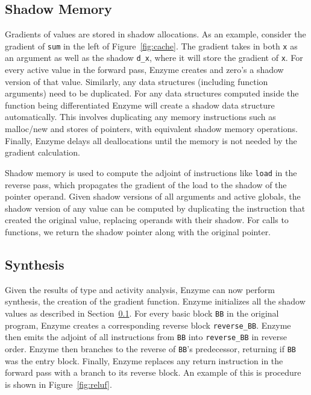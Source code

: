 \subsection{Shadow Memory}
\label{sec:shadow}
Gradients of values are stored in shadow allocations. As an example, consider the gradient of \texttt{sum} in the left of Figure~\ref{fig:cache}. The gradient takes in both \texttt{x} as an argument as well as the shadow \texttt{d\_x}, where it will store the gradient of \texttt{x}. For every active value in the forward pass, Enzyme creates and zero's a shadow version of that value. Similarly, any data structures (including function arguments) need to be duplicated.  For any data structures computed inside the function being differentiated Enzyme will create a shadow data structure automatically. This involves duplicating any memory instructions such as malloc/new and stores of pointers, with equivalent shadow memory operations. Finally, Enzyme delays all deallocations until the memory is not needed by the gradient calculation.

Shadow memory is used to compute the adjoint of instructions like \texttt{load} in the reverse pass, which propagates the gradient of the load to the shadow of the pointer operand. Given shadow versions of all arguments and active globals, the shadow version of any value can be computed by duplicating the instruction that created the original value, replacing operands with their shadow. For calls to functions, we return the shadow pointer along with the original pointer.


\subsection{Synthesis}
Given the results of type and activity analysis, Enzyme can now perform synthesis, the creation of the gradient function.
Enzyme initializes all the shadow values as described in Section~\ref{sec:shadow}.
For every basic block \texttt{BB} in the original program, Enzyme creates a corresponding reverse block \texttt{reverse\_BB}.
Enzyme then emits the adjoint of all instructions from \texttt{BB} into \texttt{reverse\_BB} in reverse order. Enzyme then branches to the reverse of \texttt{BB}'s predecessor, returning if \texttt{BB} was the entry block. Finally, Enzyme replaces any return instruction in the forward pass with a branch to its reverse block. An example of this is procedure is shown in Figure~\ref{fig:reluf}.


